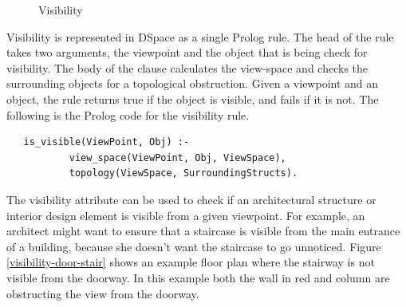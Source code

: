 \documentclass[12pt]{ucthesis}
\begin{document}
\begin{figure}[H]
 \centering
  \hspace{10 mm}
 \caption{Visibility}
\label{Visibility}
\end{figure}

Visibility is represented in DSpace as a single Prolog rule. The head of the rule takes two arguments, the viewpoint and the object that is being check for visibility. The body of the clause calculates the view-space and checks the surrounding objects for a topological obstruction. Given a viewpoint and an object, the rule returns true if the object is visible, and fails if it is not. The following is the Prolog code for the visibility rule.

\begin{verbatim}
   is_visible(ViewPoint, Obj) :- 
           view_space(ViewPoint, Obj, ViewSpace),
           topology(ViewSpace, SurroundingStructs).
\end{verbatim}

The visibility attribute can be used to check if an architectural structure or interior design element is visible from a given viewpoint. For example, an architect might want to ensure that a staircase is visible from the main entrance of a building, because she doesn't want the staircase to go unnoticed. Figure \ref{visibility-door-stair} shows an example floor plan where the stairway is not visible from the doorway. In this example both the wall in red and column are obstructing the view from the doorway. 
\end{document}
